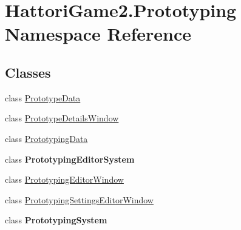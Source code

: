 \hypertarget{namespace_hattori_game2_1_1_prototyping}{}\section{Hattori\+Game2.\+Prototyping Namespace Reference}
\label{namespace_hattori_game2_1_1_prototyping}
\subsection*{Classes}
\begin{DoxyCompactItemize}
\item 
class \hyperlink{class_hattori_game2_1_1_prototyping_1_1_prototype_data}{Prototype\+Data}
\item 
class \hyperlink{class_hattori_game2_1_1_prototyping_1_1_prototype_details_window}{Prototype\+Details\+Window}
\item 
class \hyperlink{class_hattori_game2_1_1_prototyping_1_1_prototyping_data}{Prototyping\+Data}
\item 
class {\bfseries Prototyping\+Editor\+System}
\item 
class \hyperlink{class_hattori_game2_1_1_prototyping_1_1_prototyping_editor_window}{Prototyping\+Editor\+Window}
\item 
class \hyperlink{class_hattori_game2_1_1_prototyping_1_1_prototyping_settings_editor_window}{Prototyping\+Settings\+Editor\+Window}
\item 
class {\bfseries Prototyping\+System}
\end{DoxyCompactItemize}
